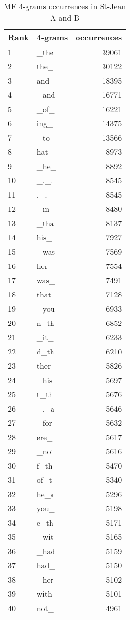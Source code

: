 \twocolumn

\begin{table}[H]
  \centering
  \caption{MF 4-grams occurrences in St-Jean A and B}
  \label{tab:4_grams_occurences_st_jean}
  \begin{tabular}{l l r}
    \toprule
    Rank & 4-grams & occurrences \\
    \midrule
    1 & \_the & 39061 \\
    2 & the\_ & 30122 \\
    3 & and\_ & 18395 \\
    4 & \_and & 16771 \\
    5 & \_of\_ & 16221 \\
    6 & ing\_ & 14375 \\
    7 & \_to\_ & 13566 \\
    8 & hat\_ & 8973 \\
    9 & \_he\_ & 8892 \\
    10 & \_.\_. & 8545 \\
    11 & .\_.\_ & 8545 \\
    12 & \_in\_ & 8480 \\
    13 & \_tha & 8137 \\
    14 & his\_ & 7927 \\
    15 & \_was & 7569 \\
    16 & her\_ & 7554 \\
    17 & was\_ & 7491 \\
    18 & that & 7128 \\
    19 & \_you & 6933 \\
    20 & n\_th & 6852 \\
    21 & \_it\_ & 6233 \\
    22 & d\_th & 6210 \\
    23 & ther & 5826 \\
    24 & \_his & 5697 \\
    25 & t\_th & 5676 \\
    26 & \_,\_a & 5646 \\
    27 & \_for & 5632 \\
    28 & ere\_ & 5617 \\
    29 & \_not & 5616 \\
    30 & f\_th & 5470 \\
    31 & of\_t & 5340 \\
    32 & he\_s & 5296 \\
    33 & you\_ & 5198 \\
    34 & e\_th & 5171 \\
    35 & \_wit & 5165 \\
    36 & \_had & 5159 \\
    37 & had\_ & 5150 \\
    38 & \_her & 5102 \\
    39 & with & 5101 \\
    40 & not\_ & 4961 \\
    \bottomrule
  \end{tabular}
\end{table}

